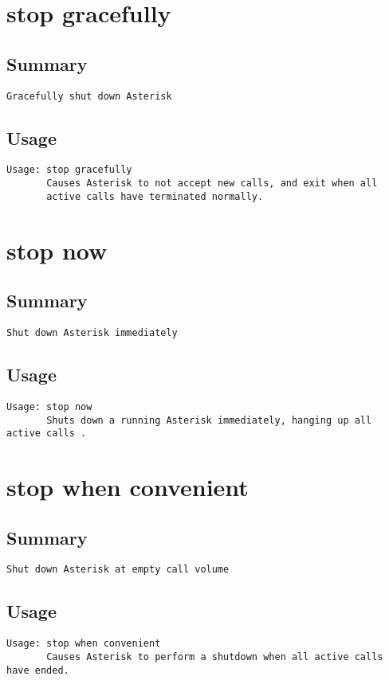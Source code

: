 \section{stop gracefully}
\subsection{Summary}
\begin{verbatim}
Gracefully shut down Asterisk
\end{verbatim}
\subsection{Usage}
\begin{verbatim}
Usage: stop gracefully
       Causes Asterisk to not accept new calls, and exit when all
       active calls have terminated normally.

\end{verbatim}


\section{stop now}
\subsection{Summary}
\begin{verbatim}
Shut down Asterisk immediately
\end{verbatim}
\subsection{Usage}
\begin{verbatim}
Usage: stop now
       Shuts down a running Asterisk immediately, hanging up all active calls .

\end{verbatim}


\section{stop when convenient}
\subsection{Summary}
\begin{verbatim}
Shut down Asterisk at empty call volume
\end{verbatim}
\subsection{Usage}
\begin{verbatim}
Usage: stop when convenient
       Causes Asterisk to perform a shutdown when all active calls have ended.

\end{verbatim}


